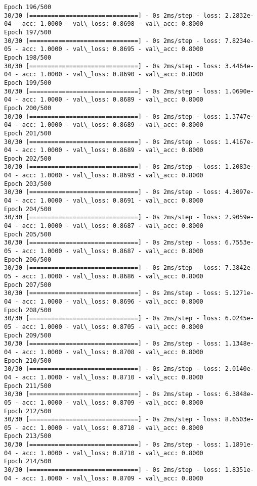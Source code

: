 \documentclass[11pt]{article}
\begin{document}
\begin{Verbatim}[commandchars=\\\{\}]
Epoch 196/500
30/30 [==============================] - 0s 2ms/step - loss: 2.2832e-04 - acc: 1.0000 - val\_loss: 0.8698 - val\_acc: 0.8000
Epoch 197/500
30/30 [==============================] - 0s 2ms/step - loss: 7.8234e-05 - acc: 1.0000 - val\_loss: 0.8695 - val\_acc: 0.8000
Epoch 198/500
30/30 [==============================] - 0s 2ms/step - loss: 3.4464e-04 - acc: 1.0000 - val\_loss: 0.8690 - val\_acc: 0.8000
Epoch 199/500
30/30 [==============================] - 0s 2ms/step - loss: 1.0690e-04 - acc: 1.0000 - val\_loss: 0.8689 - val\_acc: 0.8000
Epoch 200/500
30/30 [==============================] - 0s 2ms/step - loss: 1.3747e-04 - acc: 1.0000 - val\_loss: 0.8689 - val\_acc: 0.8000
Epoch 201/500
30/30 [==============================] - 0s 2ms/step - loss: 1.4167e-04 - acc: 1.0000 - val\_loss: 0.8689 - val\_acc: 0.8000
Epoch 202/500
30/30 [==============================] - 0s 2ms/step - loss: 1.2083e-04 - acc: 1.0000 - val\_loss: 0.8693 - val\_acc: 0.8000
Epoch 203/500
30/30 [==============================] - 0s 2ms/step - loss: 4.3097e-04 - acc: 1.0000 - val\_loss: 0.8691 - val\_acc: 0.8000
Epoch 204/500
30/30 [==============================] - 0s 2ms/step - loss: 2.9059e-04 - acc: 1.0000 - val\_loss: 0.8687 - val\_acc: 0.8000
Epoch 205/500
30/30 [==============================] - 0s 2ms/step - loss: 6.7553e-05 - acc: 1.0000 - val\_loss: 0.8687 - val\_acc: 0.8000
Epoch 206/500
30/30 [==============================] - 0s 2ms/step - loss: 7.3842e-05 - acc: 1.0000 - val\_loss: 0.8686 - val\_acc: 0.8000
Epoch 207/500
30/30 [==============================] - 0s 2ms/step - loss: 5.1271e-04 - acc: 1.0000 - val\_loss: 0.8696 - val\_acc: 0.8000
Epoch 208/500
30/30 [==============================] - 0s 2ms/step - loss: 6.0245e-05 - acc: 1.0000 - val\_loss: 0.8705 - val\_acc: 0.8000
Epoch 209/500
30/30 [==============================] - 0s 2ms/step - loss: 1.1348e-04 - acc: 1.0000 - val\_loss: 0.8708 - val\_acc: 0.8000
Epoch 210/500
30/30 [==============================] - 0s 2ms/step - loss: 2.0140e-04 - acc: 1.0000 - val\_loss: 0.8710 - val\_acc: 0.8000
Epoch 211/500
30/30 [==============================] - 0s 2ms/step - loss: 6.3848e-05 - acc: 1.0000 - val\_loss: 0.8709 - val\_acc: 0.8000
Epoch 212/500
30/30 [==============================] - 0s 2ms/step - loss: 8.6503e-05 - acc: 1.0000 - val\_loss: 0.8710 - val\_acc: 0.8000
Epoch 213/500
30/30 [==============================] - 0s 2ms/step - loss: 1.1891e-04 - acc: 1.0000 - val\_loss: 0.8710 - val\_acc: 0.8000
Epoch 214/500
30/30 [==============================] - 0s 2ms/step - loss: 1.8351e-04 - acc: 1.0000 - val\_loss: 0.8709 - val\_acc: 0.8000

\end{Verbatim}
\end{document}
